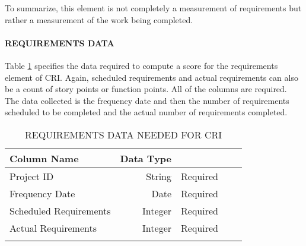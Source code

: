 \documentclass[SDSUThesis.tex]{subfiles}
\begin{document}
            To summarize, this element is not completely a measurement of requirements
            but rather a measurement of the work being completed. 
            
            \paragraph{REQUIREMENTS DATA}
                Table \ref{tab:req} specifies the data required to compute
                a score for the requirements element of CRI.  Again,
                scheduled requirements and actual requirements can also 
                be a count of story points or function points.  All of 
                the columns are required. The data collected is the
                frequency date and then the number of requirements scheduled
                to be completed and the actual number of requirements completed.
            
                \begin{longtable}{@{}l rr rr}
                    \toprule%
                     \centering%
                     {\bfseries Column Name}
                     & {\bfseries Data Type}
                     &  \\
                    
                    \cmidrule[0.4pt](r{0.125em}){1-1}%
                    \cmidrule[0.4pt](lr{0.125em}){2-2}%
                    \cmidrule[0.4pt](l{0.125em}){3-3}%
                    \endhead
                    
                    Project ID & String  & Required \\
                    \myrowcolour%
                    Frequency Date & Date & Required \\
                    Scheduled Requirements & Integer & Required \\
                    \myrowcolour%
                    Actual Requirements & Integer  & Required \\
                    
                    \bottomrule
                    
                    \caption{REQUIREMENTS DATA NEEDED FOR CRI}
                    \label{tab:req}
                \end{longtable}
            
\end{document}
